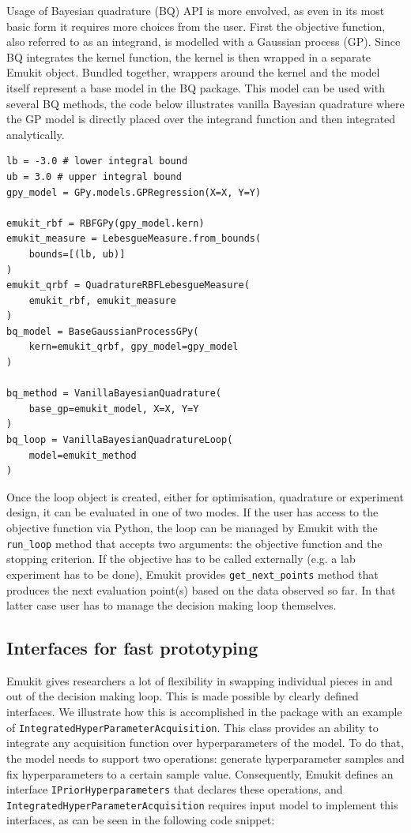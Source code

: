 Usage of Bayesian quadrature (BQ) API is more envolved, as even in its most basic form it requires more choices from the user. First the objective function, also referred to as an integrand, is modelled with a Gaussian process (GP). Since BQ integrates the kernel function, the kernel is then wrapped in a separate Emukit object. Bundled together, wrappers around the kernel and the model itself represent a base model in the BQ package. This model can be used with several BQ methods, the code below illustrates vanilla Bayesian quadrature where the GP model is directly placed over the integrand function and then integrated analytically.

\begin{verbatim}
lb = -3.0 # lower integral bound
ub = 3.0 # upper integral bound
gpy_model = GPy.models.GPRegression(X=X, Y=Y)

emukit_rbf = RBFGPy(gpy_model.kern)
emukit_measure = LebesgueMeasure.from_bounds(
    bounds=[(lb, ub)]
)
emukit_qrbf = QuadratureRBFLebesgueMeasure(
    emukit_rbf, emukit_measure
)
bq_model = BaseGaussianProcessGPy(
    kern=emukit_qrbf, gpy_model=gpy_model
)

bq_method = VanillaBayesianQuadrature(
    base_gp=emukit_model, X=X, Y=Y
)
bq_loop = VanillaBayesianQuadratureLoop(
    model=emukit_method
)
\end{verbatim}

Once the loop object is created, either for optimisation, quadrature or experiment design, it can be evaluated in one of two modes. If the user has access to the objective function via Python, the loop can be managed by Emukit with the \texttt{run\_loop} method that accepts two arguments: the objective function and the stopping criterion. If the objective has to be called externally (e.g. a lab experiment has to be done), Emukit provides \texttt{get\_next\_points} method that produces the next evaluation point(s) based on the data observed so far. In that latter case user has to manage the decision making loop themselves.

\subsection{Interfaces for fast prototyping}
Emukit gives researchers a lot of flexibility in swapping individual pieces in and out of the decision making loop. This is made possible by clearly defined interfaces. We illustrate how this is accomplished in the package with an example of \texttt{IntegratedHyperParameterAcquisition}. This class provides an ability to integrate any acquisition function over hyperparameters of the model. To do that, the model needs to support two operations: generate hyperparameter samples and fix hyperparameters to a certain sample value. Consequently, Emukit defines an interface \texttt{IPriorHyperparameters} that declares these operations, and \texttt{IntegratedHyperParameterAcquisition} requires input model to implement this interfaces, as can be seen in the following code snippet:

